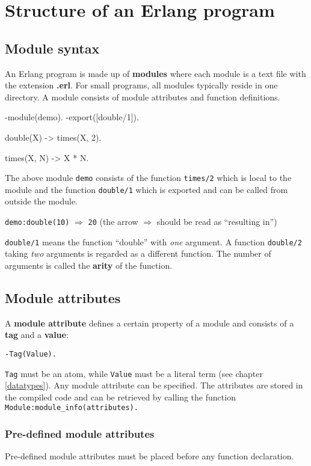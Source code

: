 \chapter{Structure of an Erlang program}

\section{Module syntax}

An Erlang program is made up of \textbf{modules} where each module is
a text file with the extension \textbf{.erl}. For small programs, all
modules typically reside in one directory.
A module consists of module attributes and function definitions.

\begin{erlang}
-module(demo).
-export([double/1]).

double(X) -> times(X, 2).

times(X, N) -> X * N.
\end{erlang}

The above module \texttt{demo} consists of the function \texttt{times/2}
which is local to the module and the function \texttt{double/1} which
is exported and can be called from outside the module.

\texttt{demo:double(10)} $\Rightarrow$ \texttt{20}\hfill
(the arrow $\Rightarrow$ should be read as ``resulting in'')

\texttt{double/1} means the function ``double'' with \textit{one}
argument. A function \texttt{double/2} taking \textit{two} arguments
is regarded as a different function. The number of arguments is called
the \textbf{arity} of the function.


\section{Module attributes}
A \textbf{module attribute} defines a certain property of a module and
consists of a \textbf{tag} and a \textbf{value}:

\texttt{-Tag(Value).}

\texttt{Tag} must be an atom, while \texttt{Value} must be a literal
term (see chapter \ref{datatypes}). Any module attribute can be specified. The
attributes are stored in the compiled code and can be retrieved by
calling the function \texttt{Module:module\_info(attributes).}

\subsection{Pre-defined module attributes}
Pre-defined module attributes must be placed before any function
declaration.


